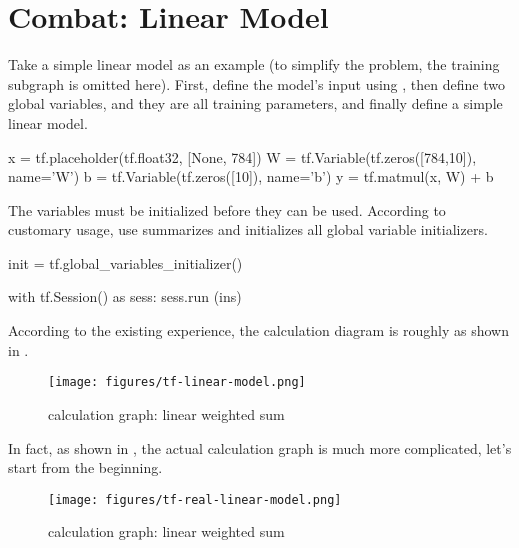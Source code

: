 \section{Combat: Linear Model}
\begin{content}
Take a simple linear model as an example (to simplify the problem, the training subgraph is omitted here). First, define the model's input using , then define two global variables, and they are all training parameters, and finally define a simple linear model.

\begin{leftbar}
\begin{python}
x  = tf.placeholder(tf.float32, [None, 784])
W = tf.Variable(tf.zeros([784,10]), name='W')
b = tf.Variable(tf.zeros([10]), name='b') 
y = tf.matmul(x, W) + b
\end{python}
\end{leftbar}

The variables must be initialized before they can be used. According to customary usage, use 
 summarizes and initializes all global variable initializers.

\begin{leftbar}
\begin{python}
init = tf.global_variables_initializer()

with tf.Session() as sess:
  sess.run (ins)
\end{python}
\end{leftbar}

According to the existing experience, the calculation diagram is roughly as shown in .

\begin{figure}[!h]
  \centering
  \texttt{[image: figures/tf-linear-model.png]}
  \caption{calculation graph: linear weighted sum}
  \label{fig:tf-linear-model}
\end{figure}

In fact, as shown in , the actual calculation graph is much more complicated, let's start from the beginning.

\begin{figure}[!h]
  \centering
  \texttt{[image: figures/tf-real-linear-model.png]}
  \caption{calculation graph: linear weighted sum}
  \label{fig:tf-real-linear-model}
\end{figure}

\end{content}


